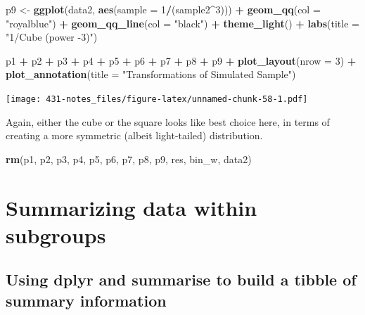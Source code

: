\documentclass[
]{book}
\newenvironment{Shaded}{\begin{snugshade}}{\end{snugshade}}
\newcommand{\DataTypeTok}[1]{\textcolor[rgb]{0.13,0.29,0.53}{#1}}
\newcommand{\DecValTok}[1]{\textcolor[rgb]{0.00,0.00,0.81}{#1}}
\newcommand{\KeywordTok}[1]{\textcolor[rgb]{0.13,0.29,0.53}{\textbf{#1}}}
\newcommand{\NormalTok}[1]{#1}
\newcommand{\OperatorTok}[1]{\textcolor[rgb]{0.81,0.36,0.00}{\textbf{#1}}}
\newcommand{\StringTok}[1]{\textcolor[rgb]{0.31,0.60,0.02}{#1}}
\begin{document}
\begin{Shaded}
\begin{Highlighting}[]
\NormalTok{p9 <-}\StringTok{ }\KeywordTok{ggplot}\NormalTok{(data2, }\KeywordTok{aes}\NormalTok{(}\DataTypeTok{sample =} \DecValTok{1}\OperatorTok{/}\NormalTok{(sample2}\OperatorTok{^}\DecValTok{3}\NormalTok{))) }\OperatorTok{+}
\StringTok{    }\KeywordTok{geom_qq}\NormalTok{(}\DataTypeTok{col =} \StringTok{"royalblue"}\NormalTok{) }\OperatorTok{+}\StringTok{ }
\StringTok{    }\KeywordTok{geom_qq_line}\NormalTok{(}\DataTypeTok{col =} \StringTok{"black"}\NormalTok{) }\OperatorTok{+}
\StringTok{    }\KeywordTok{theme_light}\NormalTok{() }\OperatorTok{+}
\StringTok{    }\KeywordTok{labs}\NormalTok{(}\DataTypeTok{title =} \StringTok{"1/Cube (power -3)"}\NormalTok{)}


\NormalTok{p1 }\OperatorTok{+}\StringTok{ }\NormalTok{p2 }\OperatorTok{+}\StringTok{ }\NormalTok{p3 }\OperatorTok{+}\StringTok{ }\NormalTok{p4 }\OperatorTok{+}\StringTok{ }\NormalTok{p5 }\OperatorTok{+}\StringTok{ }\NormalTok{p6 }\OperatorTok{+}\StringTok{ }\NormalTok{p7 }\OperatorTok{+}\StringTok{ }\NormalTok{p8 }\OperatorTok{+}\StringTok{ }\NormalTok{p9 }\OperatorTok{+}
\StringTok{    }\KeywordTok{plot_layout}\NormalTok{(}\DataTypeTok{nrow =} \DecValTok{3}\NormalTok{) }\OperatorTok{+}
\StringTok{    }\KeywordTok{plot_annotation}\NormalTok{(}\DataTypeTok{title =} \StringTok{"Transformations of Simulated Sample"}\NormalTok{)}
\end{Highlighting}
\end{Shaded}

\texttt{[image: 431-notes\_files/figure-latex/unnamed-chunk-58-1.pdf]}

Again, either the cube or the square looks like best choice here, in terms of creating a more symmetric (albeit light-tailed) distribution.

\begin{Shaded}
\begin{Highlighting}[]
\KeywordTok{rm}\NormalTok{(p1, p2, p3, p4, p5, p6, p7, p8, p9, res, bin_w, data2)}
\end{Highlighting}
\end{Shaded}

\hypertarget{summarizing-data-within-subgroups}{%
\chapter{Summarizing data within subgroups}\label{summarizing-data-within-subgroups}}

\hypertarget{using-dplyr-and-summarise-to-build-a-tibble-of-summary-information}{%
\section{Using dplyr and summarise to build a tibble of summary information}\label{using-dplyr-and-summarise-to-build-a-tibble-of-summary-information}}
\end{document}
